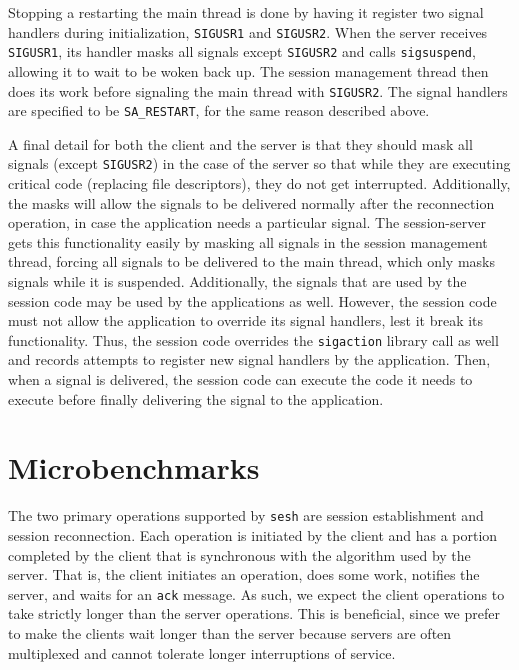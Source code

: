 \documentclass[twocolumn,10pt]{article}
\newcommand{\sesh}{\texttt{sesh}\xspace}
\begin{document}
Stopping a restarting the main thread is done by having it register two signal
handlers during initialization, \texttt{SIGUSR1} and \texttt{SIGUSR2}. When the
server receives \texttt{SIGUSR1}, its handler masks all signals except
\texttt{SIGUSR2} and calls \texttt{sigsuspend}, allowing it to wait to be woken
back up. The session management thread then does its work before signaling the
main thread with \texttt{SIGUSR2}. The signal handlers are specified to be
\texttt{SA\_RESTART}, for the same reason described above.

A final detail for both the client and the server is that they should mask all
signals (except \texttt{SIGUSR2}) in the case of the server so that while they
are executing critical code (replacing file descriptors), they do not get
interrupted. Additionally, the masks will allow the signals to be delivered
normally after the reconnection operation, in case the application needs a
particular signal. The session-server gets this functionality easily by masking
all signals in the session management thread, forcing all signals to be
delivered to the main thread, which only masks signals while it is suspended.
Additionally, the signals that are used by the session code may be used
by the applications as well. However, the session code must not allow the
application to override its signal handlers, lest it break its functionality.
Thus, the session code overrides the \texttt{sigaction} library call as well and
records attempts to register new signal handlers by the application. Then, when
a signal is delivered, the session code can execute the code it needs to execute
before finally delivering the signal to the application.

\section{Microbenchmarks}

The two primary operations supported by \sesh are session establishment and
session reconnection. Each operation is initiated by the client and has a
portion completed by the client that is synchronous with the algorithm used by
the server. That is, the client initiates an operation, does some work, notifies
the server, and waits for an \texttt{ack} message. As such, we expect the client
operations to take strictly longer than the server operations. This is
beneficial, since we prefer to make the clients wait longer than the server
because servers are often multiplexed and cannot tolerate longer interruptions
of service.
\end{document}
